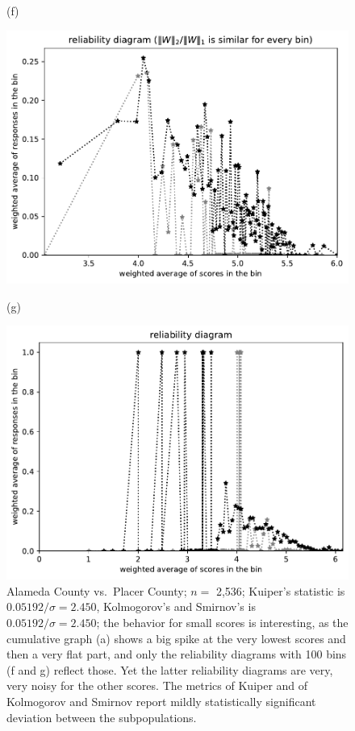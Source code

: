\documentclass{article}
\newlength{\imsize}
\begin{document}
\begin{figure}
\begin{centering}
(f)
\parbox{\imsize}{\includegraphics[width=\imsize]
{../codes/weighted/County_of_Alameda_vs_Placer-LNGI/equierrs100.pdf}}
\quad\quad
(g)
\parbox{\imsize}{\includegraphics[width=\imsize]
{../codes/weighted/County_of_Alameda_vs_Placer-LNGI/equiscores100.pdf}}

\end{centering}
\caption{Alameda County vs.\ Placer County; $n =$ 2,536;
         Kuiper's statistic is $0.05192 / \sigma = 2.450$,
         Kolmogorov's and Smirnov's is $0.05192 / \sigma = 2.450$;
         the behavior for small scores is interesting,
         as the cumulative graph (a) shows a big spike
         at the very lowest scores and then a very flat part, and
         only the reliability diagrams with 100 bins (f and g) reflect those.
         Yet the latter reliability diagrams are very, very noisy
         for the other scores. 
         The metrics of Kuiper and of Kolmogorov and Smirnov report
         mildly statistically significant deviation between the subpopulations.
}
\label{Alameda-Placer}
\end{figure}
\end{document}
